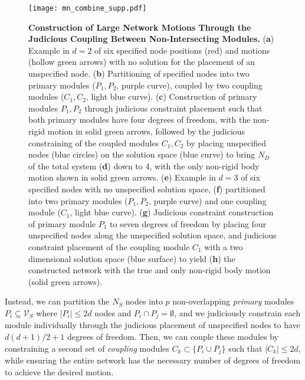 \documentclass[%
preprint,
 amsmath,amssymb,
 aps,
]{revtex4-1}
\newcommand{\mc}{\mathcal}
\begin{document}
\begin{figure}[h!]
	\centering
	\texttt{[image: mn\_combine\_supp.pdf]}
	\caption{\textbf{Construction of Large Network Motions Through the Judicious Coupling Between Non-Intersecting Modules.} (\textbf{a}) Example in $d = 2$ of six specified node positions (red) and motions (hollow green arrows) with no solution for the placement of an unspecified node. (\textbf{b}) Partitioning of specified nodes into two primary modules ($P_1, P_2$, purple curve), coupled by two coupling modules ($C_1, C_2$, light blue curve). (\textbf{c}) Construction of primary modules $P_1, P_2$ through judicious constraint placement such that both primary modules have four degrees of freedom, with the non-rigid motion in solid green arrows, followed by the judicious constraining of the coupled modules $C_1, C_2$ by placing unspecified nodes (blue circles) on the solution space (blue curve) to bring $N_D$ of the total system (\textbf{d}) down to 4, with the only non-rigid body motion shown in solid green arrows. (\textbf{e}) Example in $d = 3$ of six specified nodes with no unspecified solution space, (\textbf{f}) partitioned into two primary modules ($P_1, P_2$, purple curve) and one coupling module ($C_1$, light blue curve). (\textbf{g}) Judicious constraint construction of primary module $P_1$ to seven degrees of freedom by placing four unspecified nodes along the unspecified solution space, and judicious constraint placement of the coupling module $C_1$ with a two dimensional solution space (blue surface) to yield (\textbf{h}) the constructed network with the true and only non-rigid body motion (solid green arrows).}
	\label{fig:mn_combine}
\end{figure}

Instead, we can partition the $N_S$ nodes into $p$ non-overlapping \emph{primary} modules $P_i \subseteq \mc V_S$ where $|P_i| \leq 2d$ nodes and $P_i \cap P_j = \emptyset$, and we judiciously constrain each module individually through the judicious placement of unspecified nodes to have $d(d+1)/2 + 1$ degrees of freedom. Then, we can couple these modules by constraining a second set of \emph{coupling} modules $C_k \subset \{P_i \cup P_j\}$ such that $|C_k| \leq 2d$, while ensuring the entire network has the necessary number of degrees of freedom to achieve the desired motion.
\end{document}
